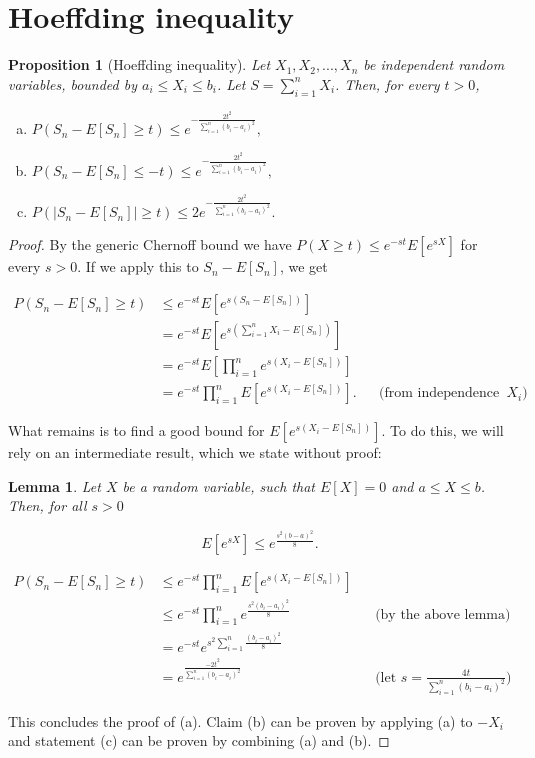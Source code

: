 \documentclass{book}
\theoremstyle{plain}%
\newtheorem{proposition}{Proposition}[section]
\newtheorem{lemma}[theorem]{Lemma}
\theoremstyle{definition}
\begin{document}
\section{Hoeffding inequality}

\begin{proposition}[Hoeffding inequality]
Let $X_1, X_2,...,X_n$ be independent random variables, bounded by $a_i \leq X_i \leq b_i$. Let $S = \sum_{i=1}^n X_i$. Then, for every $t > 0$,

\begin{enumerate}[(a)]
\item $P(S_n - E[S_n] \geq t) \leq e^{-\frac{2t^2}{\sum_{i=1}^n (b_i - a_i)^2}},$
\item $P(S_n - E[S_n] \leq -t) \leq e^{-\frac{2t^2}{\sum_{i=1}^n (b_i - a_i)^2}},$
\item $P(|S_n - E[S_n]| \geq t) \leq 2e^{-\frac{2t^2}{\sum_{i=1}^n (b_i - a_i)^2}}.$
\end{enumerate}
\end{proposition}

\begin{proof}
By the generic Chernoff bound we have $P(X \geq t) \leq e^{-st}E[e^{sX}]$ for every $s > 0$. If we apply this to $S_n - E[S_n]$, we get


\begin{align*}
    P(S_n - E[S_n] \geq t) &\leq e^{-st}E[e^{s(S_n - E[S_n])}]\\
    &= e^{-st}E[e^{s(\sum_{i=1}^n X_i - E[S_n])}]\\
    &=e^{-st}E[\prod_{i=1}^n e^{s(X_i - E[S_n])}]\\
    &=e^{-st}\prod_{i=1}^nE[ e^{s(X_i - E[S_n])}]. && \text{(from independence of $X_i$)}
\end{align*}

What remains is to find a good bound for $E[ e^{s(X_i - E[S_n])}]$. To do this, we will rely on an intermediate result, which we state without proof:

\begin{lemma}
Let $X$ be a random variable, such that $E[X] = 0$ and $a \leq X \leq b$. Then, for all $s > 0$

$$E[e^{sX}] \leq e^\frac{s^2(b - a)^2}{8}.$$
\end{lemma}


\begin{align*}
    P(S_n - E[S_n] \geq t) &\leq e^{-st}\prod_{i=1}^nE[ e^{s(X_i - E[S_n])}]\\
    &\leq e^{-st}\prod_{i=1}^n e^\frac{s^2(b_i - a_i)^2}{8} && \text{(by the above lemma)}\\
    &=e^{-st} e^{s^2 \sum_{i=1}^n \frac{(b_i - a_i)^2}{8}}\\
    &=e^\frac{-2t^2}{\sum_{i=1}^n (b_i - a_i)^2} && \text{(let $s = \frac{4t}{\sum_{i=1}^n (b_i - a_i)^2}$)}
\end{align*}

This concludes the proof of (a). Claim (b) can be proven by applying (a) to $-X_i$ and statement (c) can be proven by combining (a) and (b).

\end{proof}
\end{document}
